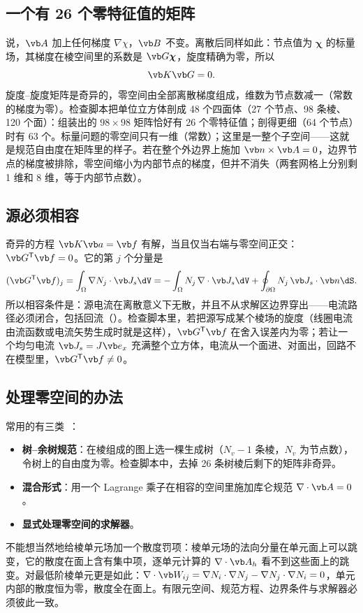 \subsection{一个有 26 个零特征值的矩阵}
 说，$\vb A$ 加上任何梯度 $\nabla\chi$，$\vb B$ 不变。离散后同样如此：节点值为 $\boldsymbol\chi$ 的标量场，其梯度在棱空间里的系数是 $\vb G\boldsymbol\chi$，旋度精确为零，所以
\begin{equation*}
\vb K\vb G=0 .
\end{equation*}
旋度--旋度矩阵是奇异的，零空间由全部离散梯度组成，维数为节点数减一（常数的梯度为零）。检查脚本把单位立方体剖成 48 个四面体（27 个节点、98 条棱、120 个面）：组装出的 $98\times98$ 矩阵恰好有 26 个零特征值；剖得更细（64 个节点）时有 63 个。标量问题的零空间只有一维（常数）；这里是一整个子空间——这就是规范自由度在矩阵里的样子。若在整个外边界上施加 $\vb n\times\vb A=0$，边界节点的梯度被排除，零空间缩小为内部节点的梯度，但并不消失（两套网格上分别剩 1 维和 8 维，等于内部节点数）。

\subsection{源必须相容}
奇异的方程 $\vb K\vb a=\vb f$ 有解，当且仅当右端与零空间正交：$\vb G^{\mathsf T}\vb f=0$。它的第 $j$ 个分量是
\begin{equation*}
(\vb G^{\mathsf T}\vb f)_j=\int_\Omega\nabla N_j\cdot\vb J_s\dV=-\int_\Omega N_j\,\nabla\cdot\vb J_s\dV+\oint_{\partial\Omega}N_j\,\vb J_s\cdot\vb n\dS .
\end{equation*}
所以相容条件是：源电流在离散意义下无散，并且不从求解区边界穿出——电流路径必须闭合，包括回流（）。检查脚本里，若把源写成某个棱场的旋度（线圈电流由流函数或电流矢势生成时就是这样），$\vb G^{\mathsf T}\vb f$ 在舍入误差内为零；若让一个均匀电流 $\vb J_s=J\vb e_x$ 充满整个立方体，电流从一个面进、对面出，回路不在模型里，$\vb G^{\mathsf T}\vb f\neq0$。

\subsection{处理零空间的办法}
常用的有三类~\cite{mfem,getdp}：
\begin{itemize}
\item \textbf{树--余树规范}：在棱组成的图上选一棵生成树（$N_v-1$ 条棱，$N_v$ 为节点数），令树上的自由度为零。检查脚本中，去掉 26 条树棱后剩下的矩阵非奇异。
\item \textbf{混合形式}：用一个 Lagrange 乘子在相容的空间里施加库仑规范 $\nabla\cdot\vb A=0$。
\item \textbf{显式处理零空间的求解器}。
\end{itemize}
不能想当然地给棱单元场加一个散度罚项：棱单元场的法向分量在单元面上可以跳变，它的散度在面上含有集中项，逐单元计算的 $\nabla\cdot\vb A_h$ 看不到这些面上的跳变。对最低阶棱单元更是如此：$\nabla\cdot\vb W_{ij}=\nabla N_i\cdot\nabla N_j-\nabla N_j\cdot\nabla N_i=0$，单元内部的散度恒为零，散度全在面上。有限元空间、规范方程、边界条件与求解器必须彼此一致。

